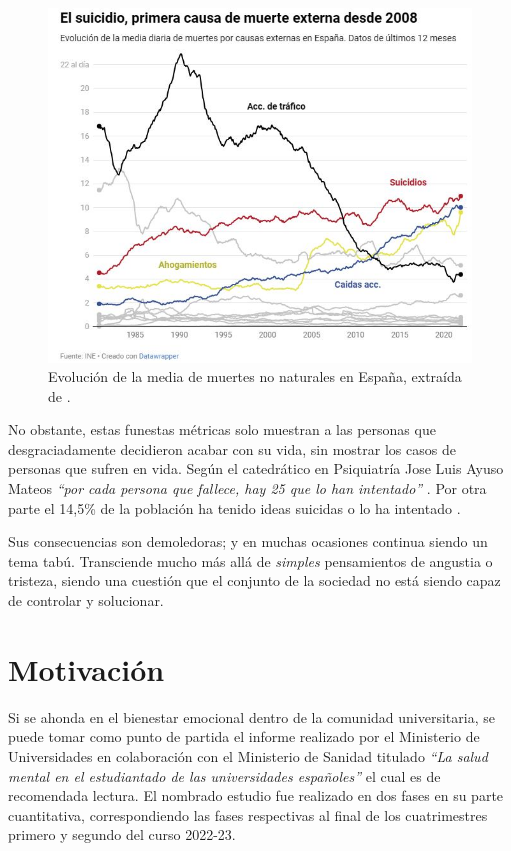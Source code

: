     \begin{figure}[h]
        \centering
        \includegraphics[width=0.85\linewidth]{figures/causas no naturales.jpg}
        \caption[Evolución de la media de muertes no naturales en España]{Evolución de la media de muertes no naturales en España, extraída de \cite{sanchez_once_2023}.}
        \label{fig:intro:causas_no_naturales}
    \end{figure}

     No obstante, estas funestas métricas solo muestran a las personas que desgraciadamente decidieron acabar con su vida, sin mostrar los casos de personas que sufren en vida. Según el catedrático en Psiquiatría Jose Luis Ayuso Mateos \textit{``por cada persona que fallece, hay 25 que lo han intentado''}  \cite{sanchez_once_2023}.  Por otra parte el 14,5\% de la población ha tenido ideas suicidas o lo ha intentado \cite{confederacion_salud_mental_espana_cuatro_2023}.

    Sus consecuencias son demoledoras; y en muchas ocasiones continua siendo un tema tabú. Transciende mucho más allá de \textit{simples} pensamientos de angustia o tristeza, siendo una cuestión que el conjunto de la sociedad no está siendo capaz de controlar y solucionar.
    
\section{Motivación}

    Si se ahonda en el bienestar emocional dentro de la comunidad universitaria, se puede tomar como punto de partida el informe realizado por el Ministerio de Universidades en colaboración con el Ministerio de Sanidad titulado \textit{``La salud mental en el estudiantado de las universidades españoles''} \cite{galache_gobierno_2023} \cite{ministerio_de_universidades_salud_2023} el cual es de recomendada lectura. El nombrado estudio fue realizado en dos fases en su parte cuantitativa, correspondiendo las fases respectivas al final de los cuatrimestres primero y segundo del curso 2022-23. 
    
